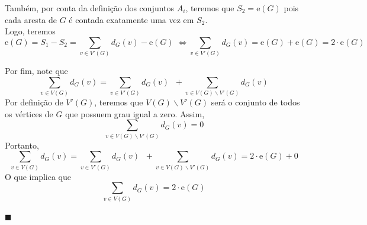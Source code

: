 \documentclass[12pt, a4paper]{article}
\theoremstyle{definition} \newtheorem{prob}{Problema}
\theoremstyle{plain} \newtheorem*{teo}{Teorema}
\begin{document}
Também, por conta da definição dos conjuntos \(A_i\), teremos que \(S_2 = \mathrm{e}(G)\) pois cada aresta de \(G\) é contada exatamente uma vez em \(S_2\). \\

Logo, teremos \[\mathrm{e}(G)= S_1 - S_2 = \sum \limits_{v \in V'(G)} d_G(v) - \mathrm{e}(G) \;  \Longleftrightarrow \sum \limits_{v \in V'(G)} d_G(v) =\mathrm{e}(G)+ \mathrm{e}(G) =2\cdot{ \mathrm{e}(G)}\]

Por fim, note que \[\sum \limits_{v \in V(G)} d_G(v) =\sum \limits_{v \in V'(G)} d_G(v) \; \; + \sum \limits_{v \in V(G) \backslash V'(G)} d_G(v)\] Por definição de \(V'(G)\), teremos que \(V(G) \backslash V'(G)\) será o conjunto de todos os vértices de \(G\) que possuem grau igual a zero. Assim, \[\sum \limits_{v \in V(G) \backslash V'(G)} d_G(v) = 0\]Portanto, \[\sum \limits_{v \in V(G)} d_G(v) =\sum \limits_{v \in V'(G)} d_G(v) \; \; + \sum \limits_{v \in V(G) \backslash V'(G)} d_G(v) = 2\cdot{\mathrm{e}(G)} + 0\]O que implica que \[\sum \limits_{v \in V(G)} d_G(v) = 2\cdot{\mathrm{e}(G)}\] 
\begin{flushright}
$\blacksquare$
\end{flushright}
\end{document}
